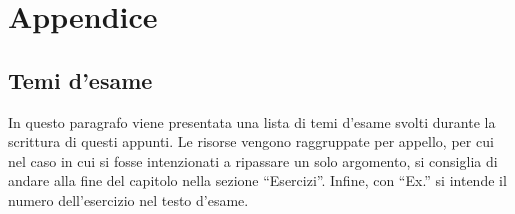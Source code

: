 \documentclass[a4paper]{article}
\newcommand{\dquotes}[1]{``#1''}
\begin{document}
	\newpage
	\newpage
	\newpage
	\section{Appendice}

	\subsection{Temi d'esame}

	In questo paragrafo viene presentata una lista di temi d'esame svolti durante la scrittura di questi appunti. Le risorse vengono raggruppate per appello, per cui nel caso in cui si fosse intenzionati a ripassare un solo argomento, si consiglia di andare alla fine del capitolo nella sezione \dquotes{Esercizi}. Infine, con \dquotes{Ex.} si intende il numero dell'esercizio nel testo d'esame.
\end{document}
